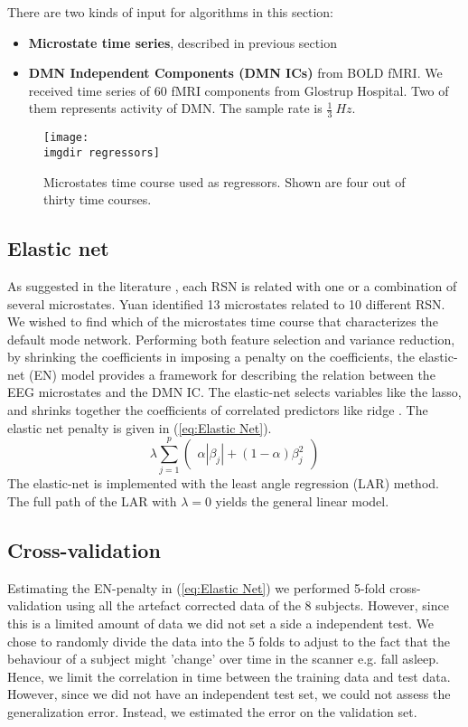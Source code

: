 \documentclass{article}
\newcommand{\imgdir}{Images/} %
\begin{document}
There are two kinds of input for algorithms in this section:
\begin{itemize}
\item \textbf{Microstate time series}, described in previous section 
\item \textbf{DMN Independent Components (DMN ICs)} from BOLD fMRI. We received time series of 60 fMRI components from Glostrup Hospital. Two of them represents activity of DMN. The sample rate is $\frac{1}{3}~Hz$. 
\end{itemize} 


\begin{figure}[!ht]
    \centering
    \texttt{[image: \\imgdir regressors]}
    \caption{Microstates time course used as regressors. Shown are four out of thirty time courses.}
    \label{fig:regressors}
\end{figure}
\subsection{Elastic net}
As suggested in the literature \cite{Yuan20122062}, each RSN is related with one or a combination of several microstates. Yuan identified 13 microstates related to 10 different RSN. We wished to find which of the microstates time course that characterizes the default mode network. Performing both feature selection and variance reduction, by shrinking the coefficients in imposing a penalty on the coefficients, the elastic-net (EN) model \cite{hastie01} provides a framework for  describing the relation between the EEG microstates and the DMN IC.
The elastic-net selects variables like the lasso, and shrinks together the coefficients of correlated predictors like ridge \cite{hastie01}. The elastic net penalty is given in (\ref{eq:Elastic Net}).
\begin{equation}
\label{eq:Elastic Net}
\lambda \sum_{j=1}^p
\begin{pmatrix}
\alpha |\beta_j| + (1-\alpha) \beta_j^2
\end{pmatrix}
\end{equation}
The elastic-net is implemented with the least angle regression (LAR) method. The full path of the LAR with $\lambda=0$ yields the general linear model.


\subsection{Cross-validation}
Estimating the EN-penalty in (\ref{eq:Elastic Net}) we performed 5-fold cross-validation using all the artefact corrected data of the 8 subjects. However, since this is a limited amount of data we did not set a side a independent test.
We chose to randomly divide the data into the 5 folds to adjust to the fact that the behaviour of a subject might 'change' over time in the scanner e.g. fall asleep. Hence, we limit the correlation in time between the training data and test data. However, since we did not have an independent test set, we could not assess the generalization error. Instead, we estimated the error on the validation set.
\end{document}
